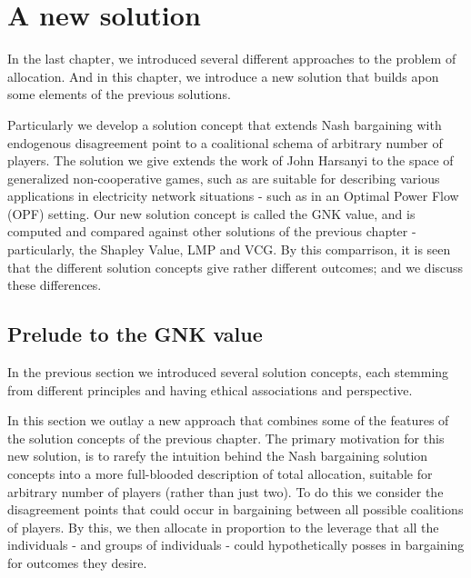 \chapter{A new solution}
\label{cha:new_solution}

In the last chapter, we introduced several different approaches to the problem of allocation.
And in this chapter, we introduce a new solution that builds apon some elements of the previous solutions.

Particularly we develop a solution concept that extends Nash bargaining with endogenous disagreement point to a coalitional schema of arbitrary number of players.
The solution we give extends the work of John Harsanyi to the space of generalized non-cooperative games, such as are suitable for describing various applications in electricity network situations - such as in an Optimal Power Flow (OPF) setting.
Our new solution concept is called the GNK value, and is computed and compared against other solutions of the previous chapter - particularly, the Shapley Value, LMP and VCG.
By this comparrison, it is seen that the different solution concepts give rather different outcomes; and we discuss these differences.

\section{Prelude to the GNK value}

In the previous section we introduced several solution concepts, each stemming from different principles and having ethical associations and perspective.

In this section we outlay a new approach that combines some of the features of the solution concepts of the previous chapter.
The primary motivation for this new solution, is to rarefy the intuition behind the Nash bargaining solution concepts into a more full-blooded description of total allocation, suitable for arbitrary number of players (rather than just two).
To do this we consider the disagreement points that could occur in bargaining between all possible coalitions of players.
By this, we then allocate in proportion to the leverage that all the individuals - and groups of individuals - could hypothetically posses in bargaining for outcomes they desire.


